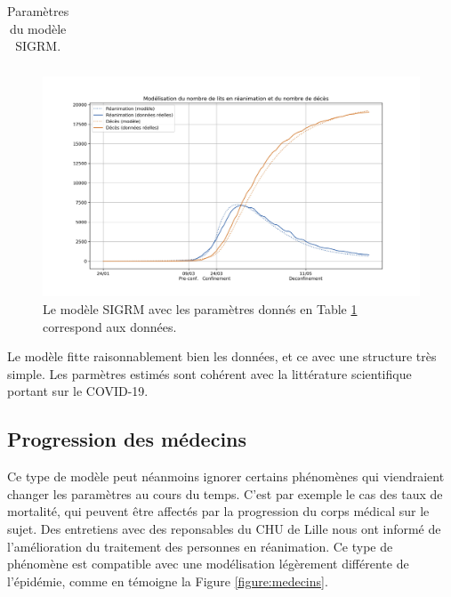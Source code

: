 \documentclass[review]{elsarticle}
\begin{document}
\begin{table}
\small
\begin{center}
\begin{tabular}{|c|c|}
    \hline
 
      \hline
\end{tabular}
\end{center}
\caption{Paramètres du modèle SIGRM.}
\label{table:meilleur}
\end{table}

\begin{figure}
\begin{center}
\includegraphics[width=1\linewidth]{figures/meilleur.jpg}
\end{center}
\caption{Le modèle SIGRM avec les paramètres donnés en Table \ref{table:meilleur} correspond aux données.}
\label{figure:meilleur}
\end{figure}

Le modèle fitte raisonnablement bien les données, et ce avec une structure très simple. Les parmètres estimés sont cohérent avec la littérature scientifique portant sur le COVID-19. 

\subsection{Progression des médecins}

Ce type de modèle peut néanmoins ignorer certains phénomènes qui viendraient changer les paramètres au cours du temps. C'est par exemple le cas des taux de mortalité, qui peuvent être affectés par la progression du corps médical sur le sujet. Des entretiens avec des reponsables du CHU de Lille nous ont informé de l'amélioration du traitement des personnes en réanimation. Ce type de phénomène est compatible avec une modélisation légèrement différente de l'épidémie, comme en témoigne la Figure \ref{figure:medecins}.
\end{document}
